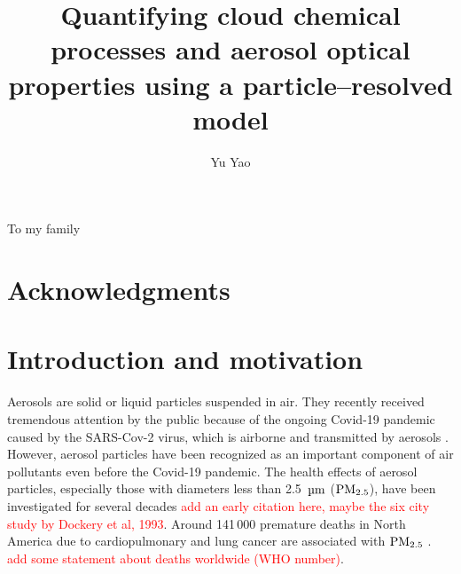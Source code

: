 \documentclass[edeposit,fullpage]{uiucthesis2009}
\begin{document}
\title{Quantifying cloud chemical processes and aerosol optical properties using a particle--resolved model}
\author{Yu Yao}
\phdthesis
{}
\maketitle


\frontmatter

\begin{abstract}

\end{abstract}

\begin{dedication}
To my family
\end{dedication}

\chapter*{Acknowledgments}


%


\tableofcontents

\mainmatter


\chapter{Introduction and motivation}
\label{chapter1}
Aerosols are solid or liquid particles suspended in air. They recently
received tremendous attention by the public because of the ongoing
Covid-19 pandemic caused by the SARS-Cov-2 virus, which is airborne
and transmitted by aerosols
\citep{prather2020reducing,zhang2020identifying,
  miller2021transmission, greenhalgh2021ten}. However, aerosol
particles have been recognized as an important component of air
pollutants even before the Covid-19 pandemic. The health effects of
aerosol particles, especially those with diameters less than 2.5~$\rm
\mu m$ ($\rm PM_{2.5}$), have been investigated for several decades
\citep{bell2007spatial, fann2012estimating} \textcolor{red}{add an
  early citation here, maybe the six city study by Dockery et al,
  1993}. Around 141\,000 premature deaths in North America due to
cardiopulmonary and lung cancer are associated with $\rm PM_{2.5}$
\citep{anenberg2010estimate}. \textcolor{red}{add some statement about
  deaths worldwide (WHO number)}.
\end{document}
